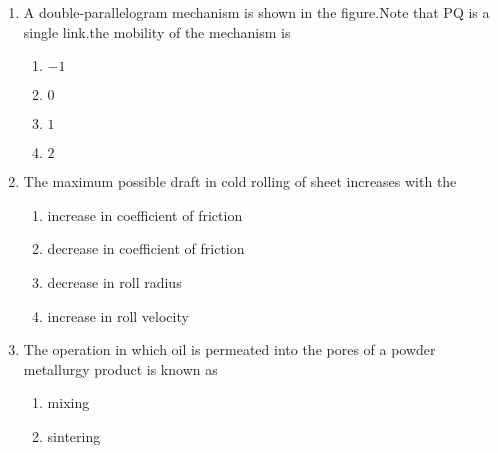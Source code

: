 \documentclass[journal,12pt,onecolumn]{IEEEtran}
\theoremstyle{remark}
\begin{document}
\begin{enumerate}
\begin{figure}[H]
        \centering
         
    \end{figure}
    \begin{multicols}{2}
        \begin{enumerate}
    \item 1 kN downward, 1 kN upward
    \item 0.5 kN upward, 0.5 kN downward
    \item 0.5 kN downward, 0.5 kN upward
    \item 1 kN upward, 1 kN upward
     \end{enumerate}
         \end{multicols}
     \item A double-parallelogram mechanism is shown in the figure.Note that PQ is a single link.the mobility of the mechanism is
      \begin{figure}[H]
        \centering
          
    \end{figure}
    \begin{multicols}{2}
         \begin{enumerate}
             \item $-1$
             \item $0$
             \item $1$
             \item $2$
    \end{enumerate}
    \end{multicols}
     \item The maximum possible draft in cold rolling of sheet increases with the
         \begin{multicols}{2}
     \begin{enumerate}
         \item increase in coefficient of friction
         \item decrease in coefficient of friction
         \item decrease in roll radius
         \item increase in roll velocity
     \end{enumerate}
         \end{multicols}
     \item The operation in which oil is permeated into the pores of a powder metallurgy product is known as
         \begin{multicols}{2}
     \begin{enumerate}
         \item mixing
         \item sintering

\end{enumerate}
\end{multicols}
\end{enumerate}
\end{document}
